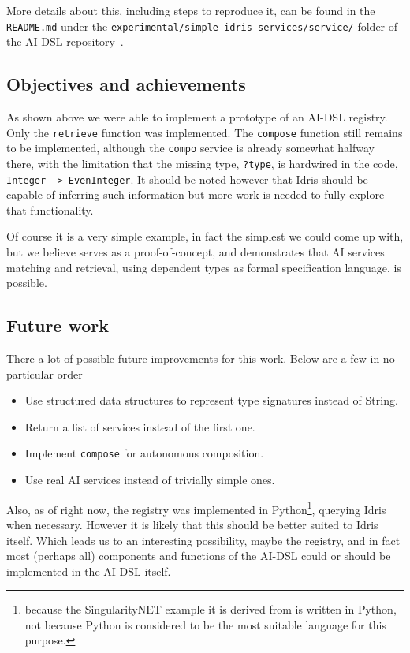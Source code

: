 \documentclass[]{report}
\begin{document}
More details about this, including steps to reproduce it, can be found
in the
\href{https://github.com/singnet/ai-dsl/blob/master/experimental/registry-dsl/README.md}{\texttt{README.md}}
under the
\href{https://github.com/singnet/ai-dsl/blob/master/experimental/registry-dsl/}{\texttt{experimental/simple-idris-services/service/}}
folder of the \href{https://github.com/singnet/ai-dsl/}{AI-DSL
  repository}~\cite{AIDSLRepo}.

\subsection{Objectives and achievements}

As shown above we were able to implement a prototype of an AI-DSL
registry.  Only the \texttt{retrieve} function was implemented.  The
\texttt{compose} function still remains to be implemented, although
the \texttt{compo} service is already somewhat halfway there, with the
limitation that the missing type, \texttt{?type}, is hardwired in the
code, \texttt{Integer -> EvenInteger}.  It should be noted however
that Idris should be capable of inferring such information but more
work is needed to fully explore that functionality.

Of course it is a very simple example, in fact the simplest we could
come up with, but we believe serves as a proof-of-concept, and
demonstrates that AI services matching and retrieval, using dependent
types as formal specification language, is possible.

\subsection{Future work}

There a lot of possible future improvements for this work.  Below are
a few in no particular order
\begin{itemize}
\item Use structured data structures to represent type signatures
  instead of String.
\item Return a list of services instead of the first one.
\item Implement \texttt{compose} for autonomous composition.
\item Use real AI services instead of trivially simple ones.
\end{itemize}

Also, as of right now, the registry was implemented in
Python\footnote{because the SingularityNET example it is derived from
is written in Python, not because Python is considered to be the most
suitable language for this purpose.}, querying Idris when necessary.
However it is likely that this should be better suited to Idris
itself.  Which leads us to an interesting possibility, maybe the
registry, and in fact most (perhaps all) components and functions of
the AI-DSL could or should be implemented in the AI-DSL itself.
\end{document}
